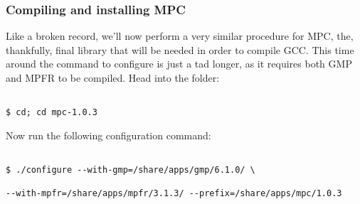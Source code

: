 \documentclass[]{article}
\begin{document}
                                                                                                                                                    \subsubsection{Compiling and installing MPC}
                                                                                                                                                    Like a broken record, we'll now perform a very similar procedure for MPC, the, thankfully, final library that will be needed in order to 
                                                                                                                                                    compile GCC. This time around the command to configure is just a tad longer, as it requires both GMP and MPFR to be compiled. Head into
                                                                                                                                                    the folder:
                                                                                                                                                    \begin{lstlisting}
                                                                                                                                                    $ cd; cd mpc-1.0.3
                                                                                                                                                    \end{lstlisting}
                                                                                                                                                    Now run the following configuration command:
                                                                                                                                                    \begin{lstlisting}
                                                                                                                                                    $ ./configure --with-gmp=/share/apps/gmp/6.1.0/ \
                                                                                                                                                                             --with-mpfr=/share/apps/mpfr/3.1.3/ --prefix=/share/apps/mpc/1.0.3
                                                                                                                                                                             \end{lstlisting}
\end{document}
